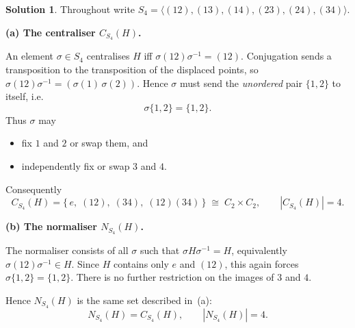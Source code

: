 \documentclass[12pt]{article}
\theoremstyle{definition} %
\newtheorem{solution}{Solution}
\theoremstyle{plain} %
\begin{document}
                  \begin{solution}
                  Throughout write \(S_{4}=\langle(12),(13),(14),(23),(24),(34)\rangle\).
                  
                  \bigskip
                  \textbf{(a)  The centraliser \(C_{S_{4}}(H)\).}
                  
                  An element \(\sigma\in S_{4}\) centralises \(H\) iff
                  \(\sigma(12)\sigma^{-1}=(12)\).
                  Conjugation sends a transposition to the transposition of the displaced
                  points, so \(\sigma(12)\sigma^{-1}=(\sigma(1)\,\sigma(2))\).
                  Hence \(\sigma\) must send the \emph{unordered} pair \(\{1,2\}\) to
                  itself, i.e.
                  \[
                     \sigma\{1,2\}=\{1,2\}.
                  \]
                  Thus \(\sigma\) may
                  \begin{itemize}
                     \item fix \(1\) and \(2\) or swap them, and
                     \item independently fix or swap \(3\) and \(4\).
                  \end{itemize}
                  Consequently
                  \[
                     C_{S_{4}}(H)
                        =\{\,e,\;(12),\;(34),\;(12)(34)\,\}
                        \;\cong\;C_{2}\times C_{2},
                        \qquad |C_{S_{4}}(H)|=4.
                  \]
                  
                  \bigskip
                  \textbf{(b)  The normaliser \(N_{S_{4}}(H)\).}
                  
                  The normaliser consists of all \(\sigma\) such that
                  \(\sigma H\sigma^{-1}=H\),
                  equivalently
                  \(\sigma(12)\sigma^{-1}\in H\).
                  Since \(H\) contains only \(e\) and \((12)\),
                  this again forces \(\sigma\{1,2\}=\{1,2\}\).
                  There is no further restriction on the images of \(3\) and \(4\).
                  
                  Hence \(N_{S_{4}}(H)\) is the same set described in~(a):
                  \[
                     N_{S_{4}}(H)=C_{S_{4}}(H),
                     \qquad |N_{S_{4}}(H)|=4.
                  \]
                  

\end{solution}
\end{document}
